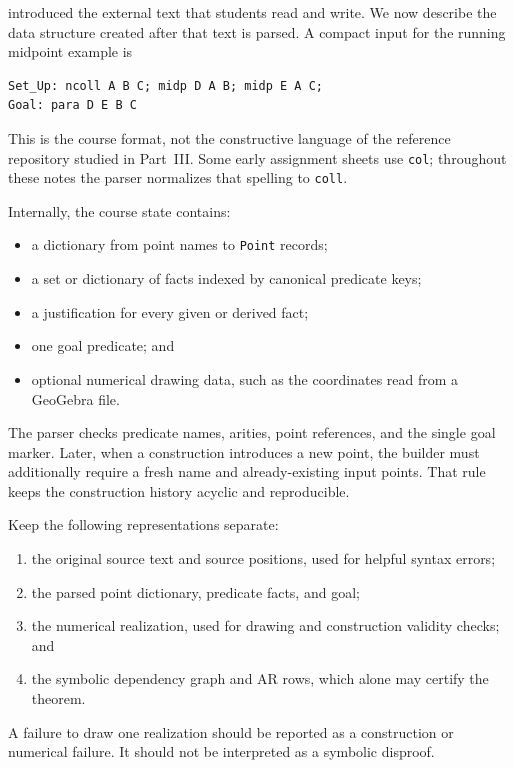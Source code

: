 \documentclass[reqno]{amsart}
\DeclareMathOperator{\1}{\textbf{1}}
\begin{document}
 introduced the external text that students
read and write. We now describe the data structure created after that text is
parsed. A compact input for the running midpoint example is
\begin{lstlisting}
Set_Up: ncoll A B C; midp D A B; midp E A C;
Goal: para D E B C
\end{lstlisting}
This is the course format, not the constructive language of the reference
repository studied in Part~III. Some early assignment sheets use \verb|col|;
throughout these notes the parser normalizes that spelling to \verb|coll|.

Internally, the course state contains:
\begin{itemize}
    \item a dictionary from point names to \texttt{Point} records;
    \item a set or dictionary of facts indexed by canonical predicate keys;
    \item a justification for every given or derived fact;
    \item one goal predicate; and
    \item optional numerical drawing data, such as the coordinates read from
          a GeoGebra file.
\end{itemize}

The parser checks predicate names, arities, point references, and the single
goal marker.  Later, when a construction introduces a new point, the builder
must additionally require a fresh name and already-existing input points.
That rule keeps the construction history acyclic and reproducible.

Keep the following representations separate:
\begin{enumerate}
    \item the original source text and source positions, used for helpful
          syntax errors;
    \item the parsed point dictionary, predicate facts, and goal;
    \item the numerical realization, used for drawing and construction
          validity checks; and
    \item the symbolic dependency graph and AR rows, which alone may certify
          the theorem.
\end{enumerate}
A failure to draw one realization should be reported as a construction or
numerical failure. It should not be interpreted as a symbolic disproof.
\end{document}
